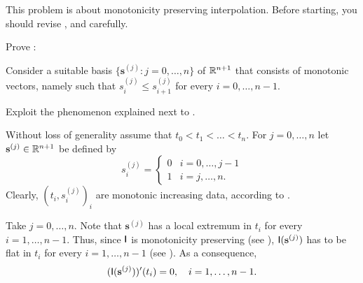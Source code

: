 \begin{problem}
This problem is about monotonicity preserving interpolation. Before starting, you should revise ,  and  carefully.
\begin{subproblem}[4] 
Prove :


\begin{hint}
Consider a suitable basis $\{\mathbf{s}^{(j)}:j=0,\dots,n\}$ of $\mathbb{R}^{n+1}$ that consists of monotonic vectors, namely such that $s^{(j)}_i \le s^{(j)}_{i+1}$ for every $i=0,\dots,n-1$.
\end{hint}
\begin{hint}
Exploit the phenomenon explained next to .
\end{hint}
\begin{solution}
Without loss of generality assume that $t_0 < t_1 < \dots <t_n$. For $j=0,\dots,n$ let $\mathbf{s}^{(j)}\in\mathbb{R}^{n+1}$ be defined by
\[
s^{(j)}_i=
\begin{cases}
0 & i=0,\dots,j-1 \\
1 & i=j,\dots,n.
\end{cases}
\]
Clearly, $(t_i,s^{(j)}_i)_i$ are monotonic increasing data, according to .


Take $j=0,\dots,n$. Note that $\mathbf{s}^{(j)}$ has a local extremum in $t_i$ for every $ i=1,\dots,n-1$. Thus, since $\mathsf{I}$ is monotonicity preserving (see ),
 $\mathsf{I}(\mathbf{s}^{(j)})$ has to be flat in $t_i$ for every $ i=1,\dots,n-1$ (see ). As a consequence,
\begin{equation}
\label{eq:sj}
(\mathsf{I}(\mathbf{s}^{(j)}))'(t_i)=0,\quad i=1,\dots,n-1.
\end{equation}


\end{solution}
\end{subproblem}
\end{problem}
